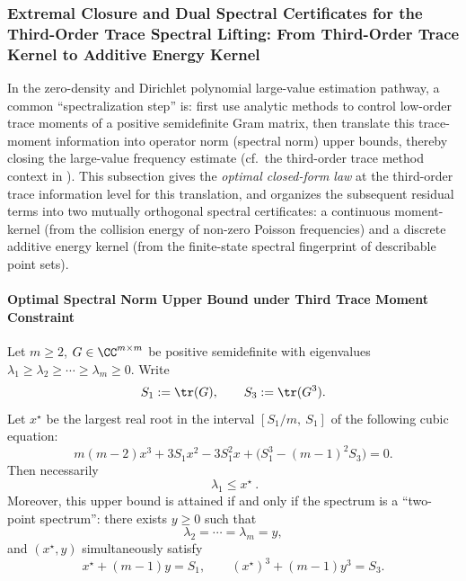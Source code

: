 \subsubsection{Extremal Closure and Dual Spectral Certificates for the Third-Order Trace Spectral Lifting: From Third-Order Trace Kernel to Additive Energy Kernel}\label{subsubsec:gm-third-trace-dual-certificates}
In the zero-density and Dirichlet polynomial large-value estimation pathway, a common ``spectralization step'' is: first use analytic methods to control low-order trace moments of a positive semidefinite Gram matrix, then translate this trace-moment information into operator norm (spectral norm) upper bounds, thereby closing the large-value frequency estimate (cf.\ the third-order trace method context in \cite{GuthMaynard2024LargeValues}). This subsection gives the \emph{optimal closed-form law} at the third-order trace information level for this translation, and organizes the subsequent residual terms into two mutually orthogonal spectral certificates: a continuous moment-kernel (from the collision energy of non-zero Poisson frequencies) and a discrete additive energy kernel (from the finite-state spectral fingerprint of describable point sets).

\paragraph{Optimal Spectral Norm Upper Bound under Third Trace Moment Constraint}
\begin{theorem}\label{thm:gm-trace3-spectral-norm-extremal}
Let \(m\ge 2\), \(G\in\CC^{m\times m}\) be positive semidefinite with eigenvalues
\(\lambda_1\ge\lambda_2\ge\cdots\ge\lambda_m\ge 0\).
Write
\[
S_1:=\tr(G),\qquad S_3:=\tr(G^3).
\]
Let \(x^\star\) be the largest real root in the interval \([S_1/m,\ S_1]\) of the following cubic equation:
\begin{equation}\label{eq:gm-trace3-cubic}
\boxed{\;
m(m-2)x^3+3S_1x^2-3S_1^2x+\bigl(S_1^3-(m-1)^2S_3\bigr)=0.\;}
\end{equation}
Then necessarily
\[
\boxed{\ \lambda_1\le x^\star\ }.
\]
Moreover, this upper bound is attained if and only if the spectrum is a ``two-point spectrum'': there exists \(y\ge 0\) such that
\[
\lambda_2=\cdots=\lambda_m=y,
\]
and \((x^\star,y)\) simultaneously satisfy
\[
x^\star+(m-1)y=S_1,\qquad (x^\star)^3+(m-1)y^3=S_3.
\]
\end{theorem}

